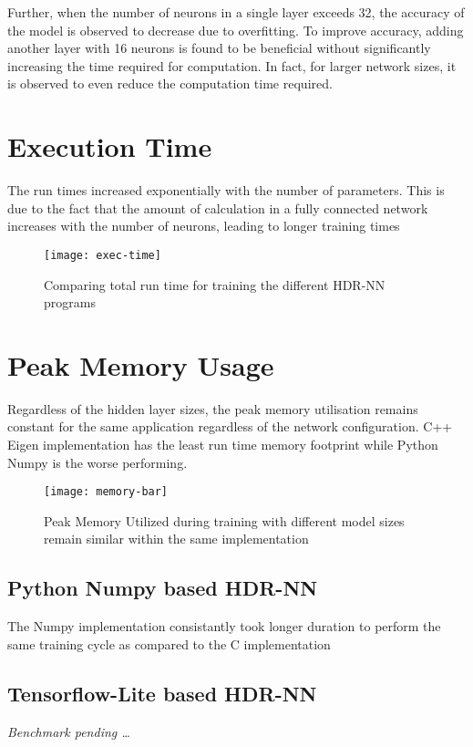 Further, when the number of neurons in a single layer exceeds 32, the accuracy of the model is observed to decrease due to overfitting. To improve accuracy, adding another layer with 16 neurons is found to be beneficial without significantly increasing the time required for computation. In fact, for larger network sizes, it is observed to even reduce the computation time required.


\section{Execution Time}
The run times increased exponentially with the number of parameters. This is due to the fact that the amount of calculation in a fully connected network increases with the number of neurons, leading to longer training times

\begin{figure}[ht]
	\centering
	\texttt{[image: exec-time]}
	\caption[Execution Time vs Model Parameters]{Comparing total run time for training the different HDR-NN programs}
\end{figure}

\section{Peak Memory Usage}
Regardless of the hidden layer sizes, the peak memory utilisation remains constant for the same application regardless of the network configuration. C++ Eigen implementation has the least run time memory footprint while Python Numpy is the worse performing.

\begin{figure}[ht]
	\centering
	\texttt{[image: memory-bar]}
	\caption[Peak Memory Utilisation]{Peak Memory Utilized during training with different model sizes remain similar within the same implementation}
\end{figure}

\subsection[Python - Numpy]{Python Numpy based HDR-NN}

The Numpy implementation consistantly took longer duration to perform the same training cycle as compared to the C implementation

\subsection[Tensorflow Lite]{Tensorflow-Lite based HDR-NN}
\textit{Benchmark pending \dots}

